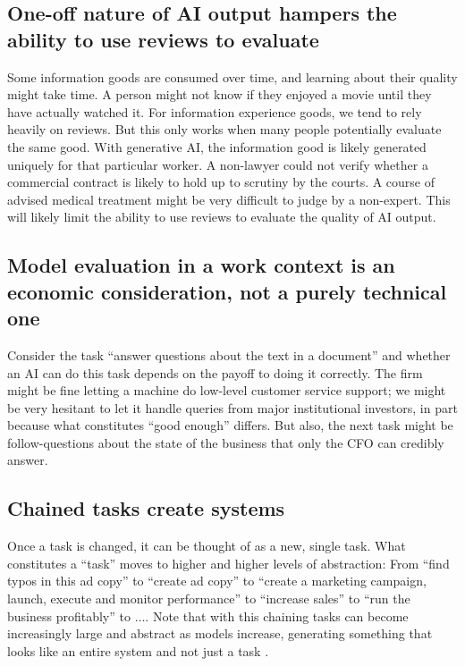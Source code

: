\documentclass{article}
\begin{document}
\subsection{One-off nature of AI output hampers the ability to use reviews to evaluate}
Some information goods are consumed over time, and learning about their quality might take time. 
A person might not know if they enjoyed a movie until they have actually watched it. 
For information experience goods, we tend to rely heavily on reviews. 
But this only works when many people potentially evaluate the same good. 
With generative AI, the information good is likely generated uniquely for that particular worker. 
A non-lawyer could not verify whether a commercial contract is likely to hold up to scrutiny by the courts. 
A course of advised medical treatment might be very difficult to judge by a non-expert.
This will likely limit the ability to use reviews to evaluate the quality of AI output.

\subsection{Model evaluation in a work context is an economic consideration, not a purely technical one}
Consider the task ``answer questions about the text in a document'' and whether an AI can do this task depends on the payoff to doing it correctly. 
The firm might be fine letting a machine do low-level customer service support; we might be very hesitant to let it handle queries from major institutional investors, in part because what constitutes ``good enough'' differs.
But also, the next task might be follow-questions about the state of the business that only the CFO can credibly answer.
  

\subsection{Chained tasks create systems}
Once a task is changed, it can be thought of as a new, single task.
What constitutes a ``task'' moves to higher and higher levels of abstraction: 
From ``find typos in this ad copy'' to ``create ad copy'' to ``create a marketing campaign, launch, execute and monitor performance'' to ``increase sales'' to ``run the business profitably'' to $\ldots$.  
Note that with this chaining tasks can become increasingly large and abstract as models increase, generating something that looks like an entire system and not just a task \cite{bresnahan2020artificial}.
\end{document}
